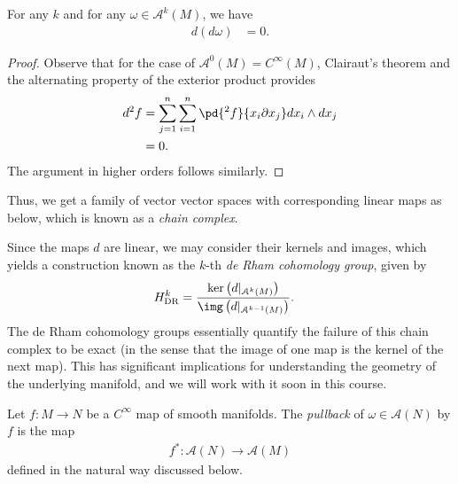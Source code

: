 \documentclass[10pt]{mypackage}
\begin{document}
\begin{proposition}
  For any $k$ and for any $\omega\in \mathcal{A}^{k}\left( M \right)$, we have
  \begin{align*}
    d\left( d\omega \right) &= 0.
  \end{align*}
\end{proposition}
\begin{proof}
  Observe that for the case of $\mathcal{A}^{0}\left( M \right) = C^{\infty}\left( M \right)$, Clairaut's theorem and the alternating property of the exterior product provides
  \begin{align*}
    d^2 f &= \sum_{j=1}^{n}\sum_{i=1}^{n} \pd{^2f}{x_i\partial x_j} dx_i\wedge dx_j\\
          &= 0.
  \end{align*}
  The argument in higher orders follows similarly.
\end{proof}
Thus, we get a family of vector vector spaces with corresponding linear maps as below, which is known as a \textit{chain complex}.
\begin{center}
\end{center}
Since the maps $d$ are linear, we may consider their kernels and images, which yields a construction known as the $k$-th \textit{de Rham cohomology group}, given by
\begin{align*}
  H^{k}_{\operatorname{DR}} &= \frac{\ker\left( d|_{\mathcal{A}^{k}\left( M \right)} \right)}{\img\left( d|_{\mathcal{A}^{k-1}\left( M \right)} \right)}.
\end{align*}
The de Rham cohomology groups essentially quantify the failure of this chain complex to be exact (in the sense that the image of one map is the kernel of the next map). This has significant implications for understanding the geometry of the underlying manifold, and we will work with it soon in this course.
\begin{definition}
  Let $f\colon M\rightarrow N$ be a $C^{\infty}$ map of smooth manifolds. The \textit{pullback} of $\omega\in \mathcal{A}\left( N \right)$ by $f$ is the map
  \begin{align*}
    f^{\ast}\colon \mathcal{A}\left( N \right)\rightarrow \mathcal{A}\left( M \right)
  \end{align*}
  defined in the natural way discussed below.
\end{definition}
\end{document}
